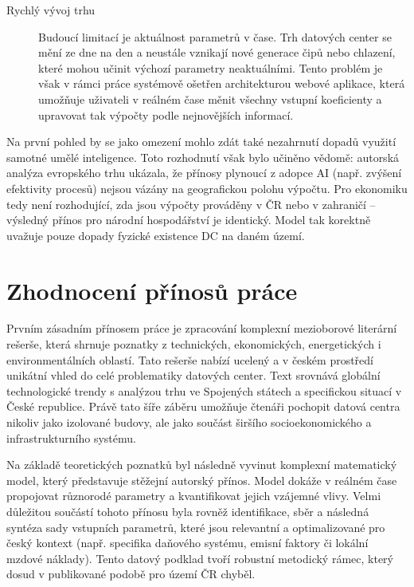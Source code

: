 \begin{description}
    \item[Rychlý vývoj trhu] Budoucí limitací je aktuálnost parametrů v čase. Trh datových center se mění ze dne na den a neustále vznikají nové generace čipů nebo chlazení, které mohou učinit výchozí parametry neaktuálními. Tento problém je však v rámci práce systémově ošetřen architekturou webové aplikace, která umožňuje uživateli v reálném čase měnit všechny vstupní koeficienty a upravovat tak výpočty podle nejnovějších informací.

\end{description}

Na první pohled by se jako omezení mohlo zdát také nezahrnutí dopadů využití samotné umělé inteligence. Toto rozhodnutí však bylo učiněno vědomě: autorská analýza evropského trhu ukázala, že přínosy plynoucí z adopce AI (např. zvýšení efektivity procesů) nejsou vázány na geografickou polohu výpočtu. Pro ekonomiku tedy není rozhodující, zda jsou výpočty prováděny v ČR nebo v zahraničí -- výsledný přínos pro národní hospodářství je identický. Model tak korektně uvažuje pouze dopady fyzické existence DC na daném území.

\section{Zhodnocení přínosů práce}
\label{subsec:vyhodnoceni_prinosu}

Prvním zásadním přínosem práce je zpracování komplexní mezioborové literární rešerše, která shrnuje poznatky z technických, ekonomických, energetických i environmentálních oblastí. Tato rešerše nabízí ucelený a v českém prostředí unikátní vhled do celé problematiky datových center. Text srovnává globální technologické trendy s analýzou trhu ve Spojených státech a specifickou situací v České republice. Právě tato šíře záběru umožňuje čtenáři pochopit datová centra nikoliv jako izolované budovy, ale jako součást širšího socioekonomického a infrastrukturního systému.

Na základě teoretických poznatků byl následně vyvinut komplexní matematický model, který představuje stěžejní autorský přínos. Model dokáže v reálném čase propojovat různorodé parametry a kvantifikovat jejich vzájemné vlivy. Velmi důležitou součástí tohoto přínosu byla rovněž identifikace, sběr a následná syntéza sady vstupních parametrů, které jsou relevantní a optimalizované pro český kontext (např. specifika daňového systému, emisní faktory či lokální mzdové náklady). Tento datový podklad tvoří robustní metodický rámec, který dosud v publikované podobě pro území ČR chyběl.

